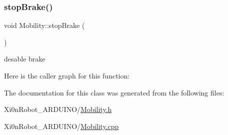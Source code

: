 \subsubsection{\texorpdfstring{stop\+Brake()}{stopBrake()}}
{\footnotesize\ttfamily void Mobility\+::stop\+Brake (\begin{DoxyParamCaption}{ }\end{DoxyParamCaption})}



desable brake 

Here is the caller graph for this function\+:


The documentation for this class was generated from the following files\+:\begin{DoxyCompactItemize}
\item 
Xi0n\+Robot\+\_\+\+A\+R\+D\+U\+I\+N\+O/\hyperlink{_mobility_8h}{Mobility.\+h}\item 
Xi0n\+Robot\+\_\+\+A\+R\+D\+U\+I\+N\+O/\hyperlink{_mobility_8cpp}{Mobility.\+cpp}\end{DoxyCompactItemize}
